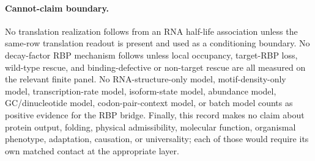 \paragraph{Cannot-claim boundary.}
No translation realization follows from an RNA half-life association unless the same-row translation readout is present and used as a conditioning boundary.  No decay-factor RBP mechanism follows unless local occupancy, target-RBP loss, wild-type rescue, and binding-defective or non-target rescue are all measured on the relevant finite panel.  No RNA-structure-only model, motif-density-only model, transcription-rate model, isoform-state model, abundance model, GC/dinucleotide model, codon-pair-context model, or batch model counts as positive evidence for the RBP bridge.  Finally, this record makes no claim about protein output, folding, physical admissibility, molecular function, organismal phenotype, adaptation, causation, or universality; each of those would require its own matched contact at the appropriate layer.
